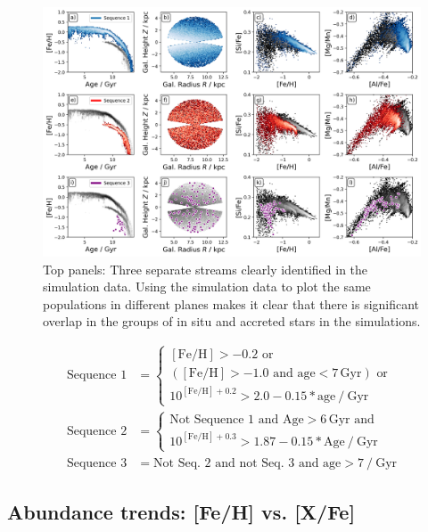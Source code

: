 \documentclass[fleqn,usenatbib]{mnras}
\begin{document}
\begin{figure}
	\includegraphics[width=\textwidth]{figures/AlFe_MgMn_selection_Age_FeH_dissection_sim.png}
    \caption{Top panels: Three separate streams clearly identified in the simulation data. Using the simulation data to plot the same populations in different planes makes it clear that there is significant overlap in the groups of in situ and accreted stars in the simulations.}
    \label{fig:AlFe_MgMn_selection_Age_FeH_dissection_sim}
\end{figure}


\begin{align}
    \text{Sequence~1} &= \begin{cases}
        \mathrm{[Fe/H] > -0.2} \text{ or} \\
        (\mathrm{[Fe/H]} > -1.0 \text{ and } \mathrm{age} < 7\,\mathrm{Gyr}) \text{ or} \\
        10^{\mathrm{[Fe/H]} + 0.2} > 2.0 - 0.15*\mathrm{age}~/~\mathrm{Gyr}
    \end{cases} \label{eq:sequence1} \\
    \text{Sequence~2} &= \begin{cases}
        \text{Not Sequence~1 and }\mathrm{Age} > 6\,\mathrm{Gyr} \text{ and} \\
        10^{\mathrm{[Fe/H]} + 0.3} > 1.87 - 0.15*\mathrm{Age}~/~\mathrm{Gyr}
    \end{cases}  \label{eq:sequence2} \\
    \text{Sequence~3} &= \text{Not Seq.~2 and not Seq.~3 and } \mathrm{age} > 7~/~\mathrm{Gyr}  \label{eq:sequence3}
\end{align}

\subsection{Abundance trends: [Fe/H] vs. [X/Fe]} \label{sec:feh_xfe}
\end{document}
